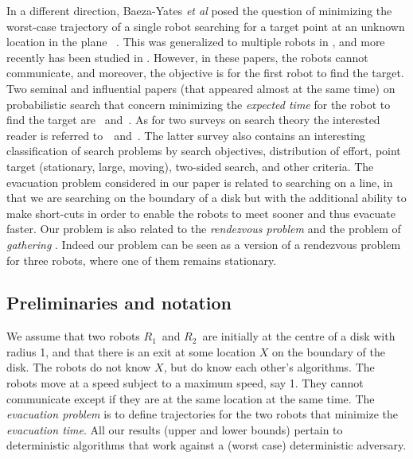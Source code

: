 \documentclass[
final
]{dmtcs-episciences}
\newcommand{\RA}{\ensuremath{R_1}}
\newcommand{\RB}{\ensuremath{R_2 }}
\theoremstyle{definition}
\begin{document}
In a different direction, Baeza-Yates {\em et al} posed the question of minimizing the worst-case trajectory of a single robot searching for a target point at an unknown location in the plane ~\cite{baezayates1993searching}. This was generalized to multiple robots in \cite{LS01}, and more recently has been studied  in \cite{Emekicalp2014,Lenzen2014}. However, in these papers, the robots cannot communicate, and moreover, the objective is for the first robot to find the target. 
Two seminal and influential papers (that appeared almost at the
same time) on probabilistic search that concern minimizing the {\em expected time}  for the robot to find the target are
\cite{beck1964linear}~and~\cite{bellman1963optimal}.
As for two surveys on search theory the interested reader is referred to~\cite{benkoski1991survey}~and~\cite{dobbie1968survey}.
The latter survey also contains 
an interesting classification of
search problems by search objectives, distribution of effort, point target
(stationary, large, moving), two-sided search, and other criteria.
The evacuation problem considered in our paper
is related to searching on a line, in that we are searching
on the boundary of a disk but with the
additional ability to make short-cuts in order
to enable the robots to meet sooner
and thus evacuate faster. 
Our problem is also related to the  {\em rendezvous problem}  and the problem of  {\em gathering} \cite{alpern1999asymmetric,PGNP2005}. Indeed our problem can be seen as a version of a rendezvous problem for three robots, where one of them remains stationary. 




\subsection{Preliminaries and notation}
\label{subsec:prelim}







We assume that two robots \RA\ and \RB\  are initially at the centre of a disk with radius 1, and that there is an exit at some location $X$ on the boundary of the disk. 
The robots do not know $X$, but do know each other's algorithms. 
The robots move at a speed subject to a maximum speed, say 1. 
They cannot communicate except if they are at the same location at the same time. 
The {\em evacuation problem} is to define trajectories for the two robots that minimize the {\em evacuation time}.
All our results (upper and lower bounds) pertain to deterministic algorithms that work against a (worst case) deterministic adversary. 
\end{document}
